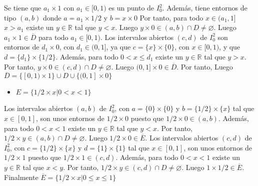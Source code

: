 \documentclass{article}
\begin{document}
Se tiene que $a_1\times 1$ con $a_1\in [0,1)$ es un punto de  $I^2_0$. Además, tiene entornos de tipo $(a,b)$ donde $a=a_1\times 1/2$ y $b=x\times 0$ Por tanto, para todo $x\in (a_1,1]$ $x > a_1$ existe un $y\in \mathbb{R}$ tal que $y<x$. Luego $y\times 0\in (a,b)\cap D\neq \varnothing$. Luego $a_1\times 1\in \overline{D}$ para todo $a_1\in [0,1)$. Los intervalos abiertos $(c,d)$ de $I^2_0$ son entornos de $d_1\times 0$, con $d_1\in (0,1]$, ya que $c=\{x\}\times \{0\}$, con $x\in [0,1)$, y que $d =\{d_1\}\times \{1/2\}$. Además, para todo $0<x\leq d_1$ existe un $y\in \mathbb{R}$ tal que $y>x$. Por tanto, $y\times 0\in (c,d) \cap  D \neq\varnothing$. Luego $(0,1]\times 0\in \overline{D}$. Por tanto, Luego $\overline{D}=\{[0,1)\times 1\}\cup D\cup \{(0,1]\times 0\}$
\begin{itemize}
\item $E=\{1/2 \times x| 0<x<1\}$
\end{itemize}
Los intervalos abiertos $(a,b)$ de $I^2_0$, con $a=\{0\}\times \{0\}$ y $b=\{1/2\}\times \{x\}$ tal que $x\in [0,1]$, son unos entornos de $1/2\times 0$ puesto que $1/2\times 0\in (a,b)$. Además, para todo $0<x<1$ existe un $y\in \mathbb{R}$ tal que $y<x$. Por tanto, $1/2\times y\in (a,b) \cap  D \neq\varnothing$. Luego $1/2\times 0\in \overline{E}$. Los intervalos abiertos $(c,d)$ de $I^2_0$, con $c=\{1/2\}\times \{x\}$ y $d=\{1\}\times \{1\}$ tal que $x\in [0,1]$, son unos entornos de  $1/2\times 1$ puesto que $1/2\times 1\in (c,d)$. Además, para todo $0<x<1$ existe un $y\in \mathbb{R}$ tal que $x<y$. Por tanto, $1/2\times y\in (c,d) \cap  D \neq\varnothing$. Luego $1\times 1/2\in \overline{E}$. Finalmente $ \overline{E}=\{1/2\times x|0\leq x \leq 1\}$
\end{document}
